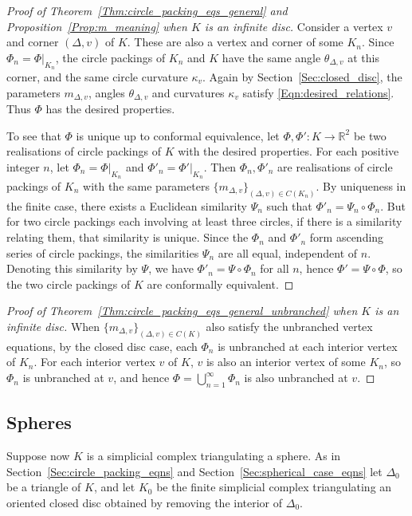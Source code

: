 \documentclass[12pt]{amsart}
\numberwithin{equation}{section}
\theoremstyle{named}
\newcommand{\refsec}[1]{Section~\ref{Sec:#1}}
\newcommand{\refeqn}[1]{\eqref{Eqn:#1}}
\newcommand{\refprop}[1]{Proposition~\ref{Prop:#1}}
\newcommand{\refthm}[1]{Theorem~\ref{Thm:#1}}
\newcommand{\R}{\mathbb{R}}
\newcommand{\To}{\longrightarrow}
\begin{document}
\begin{proof}[Proof of \refthm{circle_packing_eqs_general} and \refprop{m_meaning} when $K$ is an infinite disc]
Consider a vertex $v$ and corner $(\Delta, v)$ of $K$. These are also a vertex and corner of some $K_n$. Since $\Phi_n = \Phi|_{K_n}$, the circle packings of $K_n$ and $K$ have the same angle $\theta_{\Delta,v}$ at this corner, and the same circle curvature $\kappa_v$. Again by \refsec{closed_disc}, the parameters $m_{\Delta,v}$, angles $\theta_{\Delta,v}$ and curvatures $\kappa_v$ satisfy \refeqn{desired_relations}. Thus $\Phi$ has the desired properties.

To see that $\Phi$ is unique up to conformal equivalence, let $\Phi, \Phi' \colon K \To \R^2$ be two realisations of circle packings of $K$ with the desired properties. For each positive integer $n$, let $\Phi_n = \Phi|_{K_n}$ and $\Phi'_n = \Phi'|_{K_n}$. Then $\Phi_n, \Phi'_n$ are realisations of circle packings of $K_n$ with the same parameters $\{m_{\Delta,v}\}_{(\Delta,v) \in C(K_n)}$. 
By uniqueness in the finite case, there exists a Euclidean similarity $\Psi_n$ such that $\Phi'_n = \Psi_n \circ \Phi_n$. But for two circle packings each involving at least three circles, if there is a similarity relating them, that similarity is unique. Since the $\Phi_n$ and $\Phi'_n$ form ascending series of circle packings, the similarities $\Psi_n$ are all equal, independent of $n$. Denoting this similarity by $\Psi$, we have $\Phi'_n = \Psi \circ \Phi_n$ for all $n$, hence $\Phi' = \Psi \circ \Phi$, so the two circle packings of $K$ are conformally equivalent.
\end{proof}

\begin{proof}[Proof of \refthm{circle_packing_eqs_general_unbranched} when $K$ is an infinite disc]
When $\{m_{\Delta,v}\}_{(\Delta,v) \in C(K)}$ also satisfy the unbranched vertex equations, by the closed disc case, each $\Phi_n$ is unbranched at each interior vertex of $K_n$. For each interior vertex $v$ of $K$, $v$ is also an interior vertex of some $K_n$, so $\Phi_n$ is unbranched at $v$, and hence $\Phi = \bigcup_{n=1}^\infty \Phi_n$ is also unbranched at $v$.
\end{proof}



\subsection{Spheres}
\label{Sec:spheres}


Suppose now $K$ is a simplicial complex triangulating a sphere. As in \refsec{circle_packing_eqns} and \refsec{spherical_case_eqns} let $\Delta_0$ be a triangle of $K$, and let $K_0$ be the finite simplicial complex triangulating an oriented closed disc obtained by removing the interior of $\Delta_0$.
\end{document}
